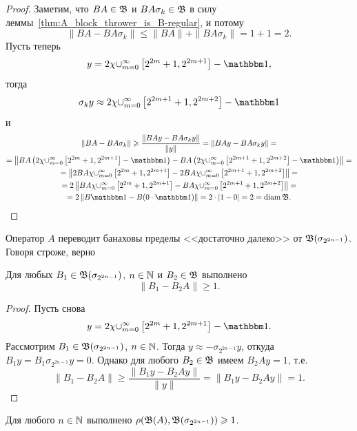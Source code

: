 \begin{proof}
	Заметим, что $BA\in\mathfrak{B}$ и $BA\sigma_k\in\mathfrak{B}$ в силу леммы~\ref{thm:A_block_thrower_is_B-regular}, и потому
	\begin{equation}
		\|BA-BA\sigma_k\| \leq \|BA\|+\|BA\sigma_k\| = 1+1 = 2
		.
	\end{equation}
	Пусть теперь
	\begin{equation}
		y = 2\chi {\cup_{m=0}^{\infty}\left[2^{2 m}+1, 2^{2 m+1}\right]} - \one
		,
	\end{equation}
	тогда
	\begin{equation}
		\sigma_k y \approx 2\chi {\cup_{m=0}^{\infty}\left[2^{2 m+1}+1, 2^{2 m+2}\right]} - \one
	\end{equation}
	и
	\begin{multline}
		\|BA-BA\sigma_k\| \geq \dfrac{\| BAy-BA\sigma_ky \|}{\|y\|} = \| BAy-BA\sigma_ky \| =
		\\=
		\left\| BA\left(2\chi {\cup_{m=0}^{\infty}\left[2^{2 m}+1, 2^{2 m+1}\right]} - \one\right)-
		BA\left(2\chi {\cup_{m=0}^{\infty}\left[2^{2 m+1}+1, 2^{2 m+2}\right]} - \one\right) \right\|=
		\\=
		\left\| 2BA\chi {\cup_{m=0}^{\infty}\left[2^{2 m}+1, 2^{2 m+1}\right]}-
		2BA\chi {\cup_{m=0}^{\infty}\left[2^{2 m+1}+1, 2^{2 m+2}\right]}  \right\|=
		\\=
		2\left\| BA\chi {\cup_{m=0}^{\infty}\left[2^{2 m}+1, 2^{2 m+1}\right]}-
		BA\chi {\cup_{m=0}^{\infty}\left[2^{2 m+1}+1, 2^{2 m+2}\right]}  \right\|=
		\\=
		2\left\| B \one- B (0\cdot \one)  \right\|=
		2\cdot| 1- 0  |= 2 = \diam \B
		.
		\end{multline}
\end{proof}


Оператор $A$ переводит банаховы пределы <<достаточно далеко>> от $\mathfrak{B}(\sigma_{2^{2n-1}})$.
Говоря строже, верно
\begin{proposition}
	Для любых $B_1 \in \mathfrak{B}(\sigma_{2^{2n-1}})$, $n\in\mathbb{N}$ и $B_2 \in \mathfrak{B}$
	выполнено
	\begin{equation}
		\|B_1 - B_2 A\| \geq 1
		.
	\end{equation}
\end{proposition}

\begin{proof}
	Пусть снова
	\begin{equation}
		y = 2\chi {\cup_{m=0}^{\infty}\left[2^{2 m}+1, 2^{2 m+1}\right]} - \one
		.
	\end{equation}
	Рассмотрим $B_1 \in \mathfrak{B}(\sigma_{2^{2n-1}})$, $n\in\mathbb{N}$.
	Тогда  $y \approx - \sigma_{2^{2n-1}} y$,
	откуда $B_1 y = B_1 \sigma_{2^{2n-1}} y = 0$.
	Однако для любого $B_2 \in \mathfrak{B}$ имеем $B_2 A y = 1$,
	т.е.
	\begin{equation}
		\|B_1 - B_2 A\| \geq \dfrac{\|B_1y - B_2 Ay\|}{\|y\|} = \|B_1y - B_2 Ay\| = 1
		.
	\end{equation}
\end{proof}

\begin{corollary}
	Для любого $n\in\mathbb{N}$ выполнено
	$\rho(\mathfrak{B}(A),\mathfrak{B}(\sigma_{2^{2n-1}}))\geqslant 1$.
\end{corollary}
